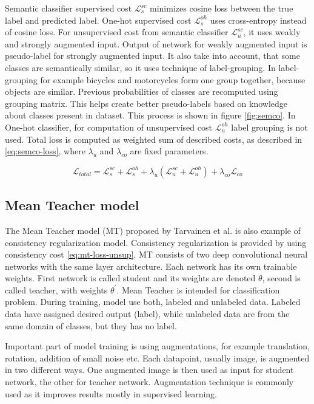 Semantic classifier supervised cost $\mathcal{L}^{sc}_s$ minimizes cosine loss between the true label and predicted label. One-hot supervised cost $\mathcal{L}^{oh}_s$ uses cross-entropy instead of cosine loss. 
For unsupervised cost from semantic classifier $\mathcal{L}^{sc}_u$, it uses weakly and strongly augmented input. Output of network for weakly augmented input is pseudo-label for strongly augmented input. It also take into account, that some classes are semantically similar, so it uses technique of label-grouping. In label-grouping for example bicycles and motorcycles form one group together, because objects are similar. Previous probabilities of classes are recomputed using grouping matrix. This helps create better pseudo-labels based on knowledge about classes present in dataset. This process is shown in figure \ref{fig:semco}. In One-hot classifier, for computation of unsupervised cost $\mathcal{L}^{oh}_u$ label grouping is not used. Total loss is computed as weighted sum of described costs, as described in \ref{eq:semco-loss}, where $\lambda_u $ and $\lambda_{co}$ are fixed parameters. \cite{nassar} 


\begin{equation}
    \mathcal{L}_{total} = \mathcal{L}^{sc}_s + \mathcal{L}^{oh}_s + \lambda_u (\mathcal{L}^{sc}_u + \mathcal{L}^{oh}_u) + \lambda_{co} \mathcal{L}_{co}
    \label{eq:semco-loss}
\end{equation}


\subsection{Mean Teacher model}
\label{mtm-chapter}
The Mean Teacher model (MT) proposed by Tarvainen et al.\cite{tarvainen} is also example of consistency regularization model. Consistency regularization is provided by using consistency cost \ref{eq:mt-loss-unsup}. MT consists of two deep convolutional neural networks with the same layer architecture. Each network has its own trainable weights. First network is called student and its weights are denoted $\theta$, second is called teacher, with weights $\theta^\prime$. Mean Teacher is intended for classification problem.
During training, model use both, labeled and unlabeled data. Labeled data have assigned desired output (label), while unlabeled data are from the same domain of classes, but they has no label. 

Important part of model training is using augmentations, for example translation, rotation, addition of small noise etc. Each datapoint, usually image, is augmented in two different ways. One augmented image is then used as input for student network, the other for teacher network. Augmentation technique is commonly used as it improves results mostly in supervised learning. %

